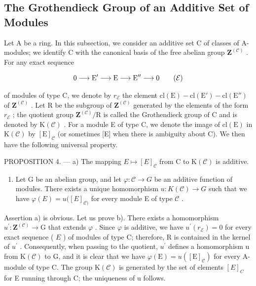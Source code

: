 \subsection{The Grothendieck Group of an Additive Set of Modules}

Let A be a ring. In this subsection, we consider an additive set C of classes of A-modules; we identify C with the canonical basis of the free abelian group \(\mathbf{Z}^{(\mathcal{C})}\) . For any exact sequence

\[
0 \longrightarrow \mathrm{E} ^ {\prime} \longrightarrow \mathrm{E} \longrightarrow \mathrm{E} ^ {\prime \prime} \longrightarrow 0\tag{\( \mathcal{E} \)}
\]

of modules of type C, we denote by \(r_{\mathcal{E}}\) the element \(\mathrm{cl}(\mathrm{E}) - \mathrm{cl}(\mathrm{E}') - \mathrm{cl}(\mathrm{E}'')\) of \(\mathbf{Z}^{(\mathcal{C})}\) . Let R be the subgroup of \(\mathbf{Z}^{(\mathcal{C})}\) generated by the elements of the form \(r_{\mathcal{E}}\) ; the quotient group \(\mathbf{Z}^{(\mathcal{C})}/\mathrm{R}\) is called the Grothendieck group of C and is denoted by \(\mathrm{K}(\mathcal{C})\) . For a module E of type C, we denote the image of \(\mathrm{cl}(\mathrm{E})\) in \(\mathrm{K}(\mathcal{C})\) by \([\mathrm{E}]_{\mathcal{C}}\) (or sometimes {[}E{]} when there is ambiguity about C). We then have the following universal property.

PROPOSITION 4. --- a) The mapping \(E \mapsto [E]_{\mathcal{C}}\) from C to \(\mathrm{K}(\mathcal{C})\) is additive.

\begin{enumerate}
\def\labelenumi{\alph{enumi})}
\setcounter{enumi}{1}
\tightlist
\item
  Let G be an abelian group, and let \(\varphi : \mathcal{C} \to G\) be an additive function of modules. There exists a unique homomorphism \(u: K(\mathcal{C}) \to G\) such that we have \(\varphi(E) = u([E]_{\mathcal{C})}\) for every module E of type \(\mathcal{C}\) .
\end{enumerate}

Assertion a) is obvious. Let us prove b). There exists a homomorphism \(u^{\prime}: \mathbf{Z}^{(\mathcal{C})} \to \mathrm{G}\) that extends \(\varphi\) . Since \(\varphi\) is additive, we have \(u^{\prime}(r_{\mathcal{E}}) = 0\) for every exact sequence ( \(E\) ) of modules of type C; therefore, R is contained in the kernel of \(u^{\prime}\) . Consequently, when passing to the quotient, \(u^{\prime}\) defines a homomorphism u from \(\mathrm{K}(\mathcal{C})\) to G, and it is clear that we have \(\varphi(\mathrm{E}) = u([\mathrm{E}]_{\mathcal{C}})\) for every A-module of type C. The group \(\mathrm{K}(\mathcal{C})\) is generated by the set of elements \([E]_{C}\) for E running through C; the uniqueness of u follows.

